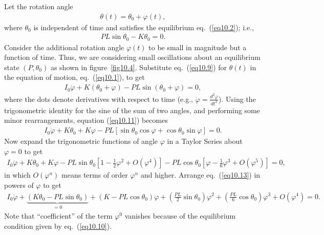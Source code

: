 \documentclass{AeroStructure-ERJohnson}
\begin{document}
Let the rotation angle\vspace*{-6pt}
\begin{align}\label{eq10.9}
\theta(t)=\theta_{0}+\varphi(t),
\end{align}
where $\theta_{0}$ is independent of time and satisfies the equilibrium eq.~(\ref{eq10.2}); i.e.,
\begin{align}\label{eq10.10}
P L \sin \theta_{0}-K \theta_{0}=0.
\end{align}
\noindent Consider the additional rotation angle $\varphi(t)$ to be small in magnitude but a function of time. Thus, we are considering small oscillations about an equilibrium state $\left(P, \theta_{0}\right)$ as shown in figure~\ref{fig10.4}. Substitute eq.~(\ref{eq10.9}) for $\theta(t)$ in the equation of motion, eq.~(\ref{eq10.1}), to get
\begin{align}\label{eq10.11}
I_{0} \ddot{\varphi}+K(\theta_{0}+\varphi)-P L \sin \left(\theta_{0}+\varphi\right)=0,
\end{align}
where the dots denote derivatives with respect to time \Big(e.g., $\ddot{\varphi}=\frac{d^{2} \varphi}{d t^{2}}$\Big). Using the trigonometric identity for the sine of the sum of two angles, and performing some minor rearrangements, equation (\ref{eq10.11}) becomes\pagebreak
\begin{align}\label{eq10.12}
I_{0} \ddot{\varphi}+K \theta_{0}+K \varphi-P L\left[\sin \theta_{0} \cos \varphi+\cos \theta_{0} \sin \varphi\right]=0.
\end{align}
Now expand the trigonometric functions of angle $\varphi$ in a Taylor Series about $\varphi=0$ to get
\begin{align}\label{eq10.13}
I_{0} \ddot{\varphi}+K \theta_{0}+K \varphi-P L \sin \theta_{0}\left[1-\frac{1}{2} \varphi^{2}+O(\varphi^{4})\right]-P L \cos \theta_{0}\left[\varphi-\frac{1}{6} \varphi^{3}+O(\varphi^{5})\right]=0,
\end{align}
in which $O\left(\varphi^{n}\right)$ means terms of order $\varphi^{n}$ and higher. Arrange eq.~(\ref{eq10.13}) in powers of $\varphi$ to get
\begin{align}\label{eq10.14}
I_{0} \ddot{\varphi}+\underbrace{\left(K \theta_{0}-P L \sin \theta_{0}\right)}_{=0}+\left(K-P L \cos \theta_{0}\right) \varphi+\left(\frac{P L}{2} \sin \theta_{0}\right) \varphi^{2}+\left(\frac{P L}{6} \cos \theta_{0}\right) \varphi^{3}+O(\varphi^{4})=0.
\end{align}
Note that ``coefficient'' of the term $\varphi^{0}$ vanishes because of the equilibrium condition given by eq.~(\ref{eq10.10}).
\end{document}
